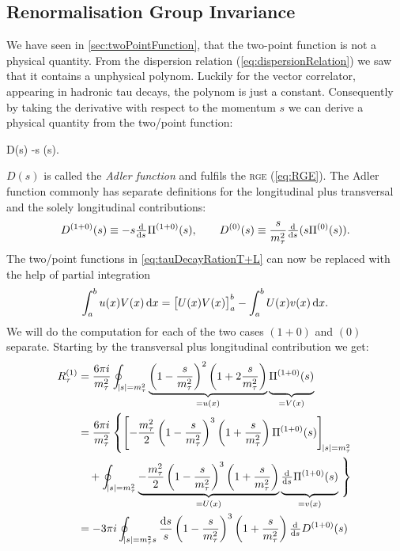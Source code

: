 \documentclass[../../index.tex]{subfiles}
\begin{document}
\subsection{Renormalisation Group Invariance}
We have seen in \cref{sec:twoPointFunction}, that the two-point function is not
a physical quantity. From the dispersion relation (\cref{eq:dispersionRelation})
we saw that it contains a unphysical polynom. Luckily for the vector correlator,
appearing in hadronic tau decays, the polynom is just a constant. Consequently
by taking the derivative with respect to the momentum \(s\) we can derive a
physical quantity from the two\-/point function:
\begin{tcolorbox}
  D(s) \equiv -s  \Pi(s).
\end{tcolorbox}
\(D(s)\) is called the \textit{Adler function} and fulfils the \textsc{rge}
(\cref{eq:RGE}). The Adler function commonly has separate definitions for the
longitudinal plus transversal and the solely longitudinal contributions:
\begin{equation}
  \label{eq:adlerFunction}
  D^{(1+0)}(s) \equiv -s \od{}{s} \Pi^{(1+0)}(s), \qquad D^{(0)}(s) \equiv \frac{s}{m_\tau^2} \od{}{s} (s \Pi^{(0)}(s)).
\end{equation}
The two\-/point functions in \cref{eq:tauDecayRationT+L} can now be replaced with
the help of partial integration
\begin{equation}
  \int_a^b u(x) V(x) \dif x = \left[ U(x) V(x) \right]_a^b - \int_a^b U(x) v(x) \dif x.
\end{equation}
We will do the computation for each of the two cases \((1+0)\) and \((0)\) separate.
Starting by the transversal plus longitudinal contribution we get:
\begin{equation}
  \begin{split}
    R_\tau^{(1)} &= \frac{6 \pi i}{m_\tau^2}
    \oint_{\abs{s}=m_\tau^2}\underbrace{ \left( 1 - \frac{s}{m_\tau^2} \right)^2
      \left( 1 + 2 \frac{s}{m_\tau^2} \right)
    }_{= u(x)} \underbrace{ \vphantom{\left( \frac{s}{m_\tau^2} \right)} \Pi^{(1+0)}(s)}_{=V(x)} \\
    &= \frac{6 \pi i}{m_\tau^2} \left\{ \left[ -\frac{m_\tau^2}{2} \left( 1 -
          \frac{s}{m_\tau^2} \right)^3 \left( 1 + \frac{s}{m_\tau^2} \right)
        \Pi^{(1+0)}(s) \right]_{\abs{s}=m_\tau^2} \right. \\
    &\quad+ \oint_{\abs{s}=m_\tau^2} \underbrace{-\frac{m_\tau^2}{2} \left( 1 -
        \frac{s}{m_\tau^2} \right)^3 \left( 1 + \frac{s}{m_\tau^2} \right)
    }_{=U(x)} \underbrace{\vphantom{\left( \frac{1}{m_\tau^2} \right)}\od{}{s}
      \Pi^{(1+0)}(s)}_{=v(x)}
    \left. \vphantom{\left[ \left( \frac{1}{m_\tau^2} \right) \right]} \right\} \\
    &= -3 \pi i \oint_{\abs{s}=m_\tau^2s} \frac{\dif s}{s} \left( 1 -
      \frac{s}{m_\tau^2} \right)^3 \left( 1 + \frac{s}{m_\tau^2} \right)
    \od{}{s} D^{(1+0)}(s)
  \end{split}
\end{equation}
\end{document}
